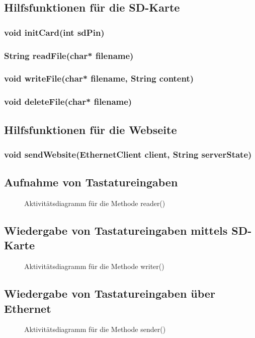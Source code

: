 \subsection{Hilfsfunktionen für die SD-Karte}
\subsubsection{void initCard(int sdPin)}
\subsubsection{String readFile(char* filename)}
\subsubsection{void writeFile(char* filename, String content)}
\subsubsection{void deleteFile(char* filename)}


\subsection{Hilfsfunktionen für die Webseite}
\subsubsection{void sendWebsite(EthernetClient client, String serverState)}


\subsection{Aufnahme von Tastatureingaben}
\begin{figure}
  \centering
  \caption{Aktivitätsdiagramm für die Methode reader()}
  \label{diagram_reader}
\end{figure}


\subsection{Wiedergabe von Tastatureingaben mittels SD-Karte}
\begin{figure}
  \centering
  \caption{Aktivitätsdiagramm für die Methode writer()}
  \label{diagram_writer}
\end{figure}


\subsection{Wiedergabe von Tastatureingaben über Ethernet}
\begin{figure}
  \centering
  \caption{Aktivitätsdiagramm für die Methode sender()}
  \label{diagram_sender}
\end{figure}


